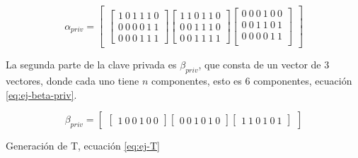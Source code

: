 \begin{equation}\label{eq:ej-alpha-priv}
{\alpha_{priv}} = \left[
	\begin{array}{c}
	\left[\begin{array}{c}
		1\ 0\ 1\ 1\ 1\ 0\\
		0\ 0\ 0\ 0\ 1\ 1\\
		0\ 0\ 0\ 1\ 1\ 1
	\end{array}\right]
		
	\left[\begin{array}{c}
		1\ 1\ 0\ 1\ 1\ 0\\
		0\ 0\ 1\ 1\ 1\ 0\\
		0\ 0\ 1\ 1\ 1\ 1
	\end{array}\right]
	
	\left[\begin{array}{c}
		0\ 0\ 0\ 1\ 0\ 0\\
		0\ 0\ 1\ 1\ 0\ 1\\
		0\ 0\ 0\ 0\ 1\ 1\\
	\end{array}\right]
	\end{array}
	\right]
\end{equation}

La segunda parte de la clave privada es $\beta_{priv}$, que consta de un vector de $3$ vectores, donde cada uno tiene $n$ componentes, esto es $6$ componentes, ecuación \ref{eq:ej-beta-priv}.

\begin{equation}\label{eq:ej-beta-priv}
{\beta_{priv}} = \left[
	\begin{array}{c}
	\left[\begin{array}{c}
		1\ 0\ 0\ 1\ 0\ 0
	\end{array}\right]
	
	\left[\begin{array}{c}
		0\ 0\ 1\ 0\ 1\ 0
	\end{array}\right]
	
	\left[\begin{array}{c}
		1\ 1\ 0\ 1\ 0\ 1
	\end{array}\right]
	\end{array}
	\right]
\end{equation}


Generación de T, ecuación \ref{eq:ej-T}

